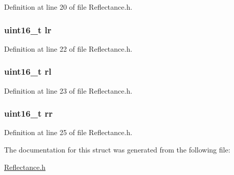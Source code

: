 Definition at line 20 of file Reflectance.\+h.

\subsubsection[{\texorpdfstring{lr}{lr}}]{\setlength{\rightskip}{0pt plus 5cm}uint16\+\_\+t lr}\hypertarget{structdigital__sensor__value___af650f74b54fbe6d55c96161d2a7098ea}{}\label{structdigital__sensor__value___af650f74b54fbe6d55c96161d2a7098ea}


Definition at line 22 of file Reflectance.\+h.

\subsubsection[{\texorpdfstring{rl}{rl}}]{\setlength{\rightskip}{0pt plus 5cm}uint16\+\_\+t rl}\hypertarget{structdigital__sensor__value___a55f8b53aee5b41e8af88a816fab2b70b}{}\label{structdigital__sensor__value___a55f8b53aee5b41e8af88a816fab2b70b}


Definition at line 23 of file Reflectance.\+h.

\subsubsection[{\texorpdfstring{rr}{rr}}]{\setlength{\rightskip}{0pt plus 5cm}uint16\+\_\+t rr}\hypertarget{structdigital__sensor__value___a6988d1a89f109b3f8d0e06547a5362f6}{}\label{structdigital__sensor__value___a6988d1a89f109b3f8d0e06547a5362f6}


Definition at line 25 of file Reflectance.\+h.



The documentation for this struct was generated from the following file\+:\begin{DoxyCompactItemize}
\item 
\hyperlink{_reflectance_8h}{Reflectance.\+h}\end{DoxyCompactItemize}
